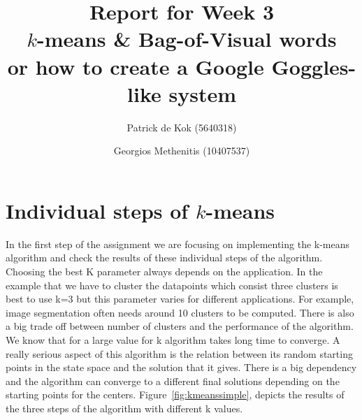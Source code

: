 \documentclass[a4paper,10pt]{article}
\title{Report for Week 3 \\\normalsize $k$-means \& Bag-of-Visual words\\ or how to create a Google Goggles-like system}
\author{Patrick de Kok (5640318) \and Georgios Methenitis (10407537)}
\begin{document}
\maketitle
\thispagestyle{empty}

\section{Individual steps of $k$-means}
In the first step of the assignment we are focusing on implementing the k-means algorithm and check the results of these individual steps of the algorithm. Choosing the best K parameter always depends on the application. In the example that we have to cluster the datapoints which consist three clusters is best to use k=3 but this parameter varies for different applications. For example, image segmentation often needs around 10 clusters to be computed. There is also a big trade off between number of clusters and the performance of the algorithm. We know that for a large value for k algorithm takes long time to converge.
A really serious aspect of this algorithm is the relation between its random starting points in the state space and the solution that it gives. There is a big dependency and the algorithm can converge to a different final solutions depending on the starting points for the centers. Figure~\ref{fig:kmeanssimple}, depicts the results of the three steps of the algorithm with different k values.
\end{document}
